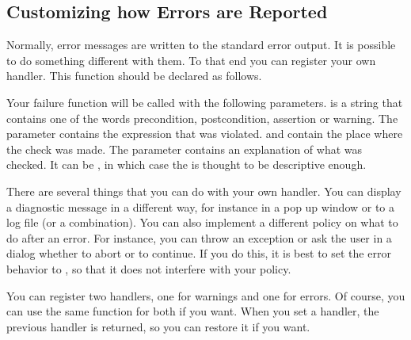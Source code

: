 \begin{ccAdvanced}

\subsection{Customizing how Errors are Reported}

Normally, error messages are written to the standard error output.
It is possible to do something different with them.
To that end you can register your own handler.
This function should be declared as follows.

\ccTexHtml{\begin{samepage}}{}
\renewcommand{\ccLongParamLayout}{\ccTrue}

\lcTex{\ccAutoIndexingOff}
\ccTexHtml{\end{samepage}}{}
\lcTex{\ccAutoIndexingOn}

Your failure function will be called with the following parameters.
 is a string that contains one of the words precondition,
postcondition, assertion or warning. 
The parameter  contains the expression that was violated.
 and  contain the place where the check was made.
The  parameter contains an explanation of what was 
checked. 
It can be , in which case the  is thought
to be descriptive enough.

There are several things that you can do with your own handler.
You can display a diagnostic message in a different way, for instance in 
a pop up window or to a log file (or a combination).
You can also implement a different policy on what to do after an error.
For instance, you can throw an exception or ask the user in a dialog 
whether to abort or to continue.
If you do this, it is best to set the error behavior to
, so that it does not interfere with your policy.

You can register two handlers, one for warnings and one for errors.
Of course, you can use the same function for both if you want.
When you set a handler, the previous handler is returned, so you can restore
it if you want.


\ccGlueBegin
{}


\end{ccAdvanced}
